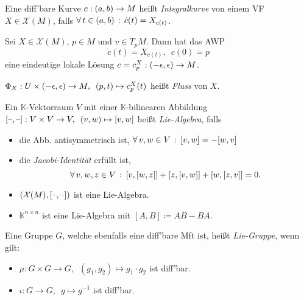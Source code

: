 \documentclass{cheat-sheet}
\newcommand{\K}{\mathbb{K}} %
\newcommand{\vinterval}{\ointerval{-\epsilon}{\epsilon}} %
\newcommand{\VF}{\mathcal{X}} %
\begin{document}

\begin{defn}
  Eine diff'bare Kurve $c : \left( a, b \right) \to M$ heißt \emph{Integralkurve} von einem VF $X \in \VF(M)$, falls
  $\forall \, {t \in \left( a, b \right)} \,:\, \dot{c}(t) = X_{c(t)}$.
\end{defn}

\begin{lem}
  Sei $X \in \VF(M)$, $p \in M$ und $v \in T_p M$. Dann hat das AWP
  \[ \dot{c}(t) = X_{c(t)}, \enspace c(0) = p \]
  eine eindeutige lokale Lösung $c = c_p^X : \vinterval \to M$.
\end{lem}

\begin{defn}
  $\Phi_X : U \times \vinterval \to M, \enspace (p, t) \mapsto c_p^X(t)$ heißt \emph{Fluss} von $X$.
\end{defn}


\begin{defn}
  Ein $\K$-Vektorraum $V$ mit einer $\K$-bilinearen Abbildung $[\text{--},\text{--}] : V \times V \to V, \enspace (v, w) \mapsto [v,w]$ heißt \emph{Lie-Algebra}, falls
  \begin{itemize}
    \item die Abb. antisymmetrisch ist, \dh{} $\forall \, {v, w \in V} \,:\, [v, w] = - [w, v]$
    \item die \emph{Jacobi-Identität} erfüllt ist, \dh{}
    \[ \forall \, {v,w,z \in V} \,:\, [v, [w, z]] + [z, [v, w]] + [w, [z, v]] = 0. \]
  \end{itemize}
\end{defn}

\begin{bspe}
  \begin{itemize}
    \item $(\VF(M), [\blank,\blank])$ ist eine Lie-Algebra.
    \item $\K^{n \times n}$ ist eine Lie-Algebra mit $[A, B] \coloneqq AB - BA$.
  \end{itemize}
\end{bspe}

\begin{defn}
  Eine Gruppe $G$, welche ebenfalls eine diff'bare Mft ist, heißt \emph{Lie-Gruppe}, wenn gilt:
  \begin{itemize}
    \item $\mu : G \times G \to G, \enspace (g_1, g_2) \mapsto g_1 \cdot g_2$ ist diff'bar.
    \item $\iota : G \to G, \enspace g \mapsto g^{-1}$ ist diff'bar.
  \end{itemize}
\end{defn}
\end{document}
